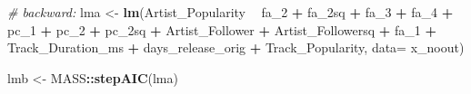 \documentclass[
]{article}
\newenvironment{Shaded}{\begin{snugshade}}{\end{snugshade}}
\newcommand{\CommentTok}[1]{\textcolor[rgb]{0.56,0.35,0.01}{\textit{#1}}}
\newcommand{\DataTypeTok}[1]{\textcolor[rgb]{0.13,0.29,0.53}{#1}}
\newcommand{\DecValTok}[1]{\textcolor[rgb]{0.00,0.00,0.81}{#1}}
\newcommand{\KeywordTok}[1]{\textcolor[rgb]{0.13,0.29,0.53}{\textbf{#1}}}
\newcommand{\NormalTok}[1]{#1}
\newcommand{\OperatorTok}[1]{\textcolor[rgb]{0.81,0.36,0.00}{\textbf{#1}}}
\newcommand{\StringTok}[1]{\textcolor[rgb]{0.31,0.60,0.02}{#1}}
\begin{document}
\begin{Shaded}
\begin{Highlighting}[]
\CommentTok{# backward:}
\NormalTok{lma <-}\StringTok{ }\KeywordTok{lm}\NormalTok{(Artist_Popularity }\OperatorTok{~}\StringTok{ }\NormalTok{fa_}\DecValTok{2} \OperatorTok{+}\StringTok{ }\NormalTok{fa_2sq }\OperatorTok{+}\StringTok{ }\NormalTok{fa_}\DecValTok{3} \OperatorTok{+}\StringTok{ }\NormalTok{fa_}\DecValTok{4} \OperatorTok{+}\StringTok{ }\NormalTok{pc_}\DecValTok{1} \OperatorTok{+}\StringTok{ }\NormalTok{pc_}\DecValTok{2} \OperatorTok{+}\StringTok{ }\NormalTok{pc_2sq }\OperatorTok{+}\StringTok{ }\NormalTok{Artist_Follower }
          \OperatorTok{+}\StringTok{ }\NormalTok{Artist_Followersq }\OperatorTok{+}\StringTok{ }\NormalTok{fa_}\DecValTok{1} \OperatorTok{+}\StringTok{ }\NormalTok{Track_Duration_ms}
          \OperatorTok{+}\StringTok{ }\NormalTok{days_release_orig }\OperatorTok{+}\StringTok{ }\NormalTok{Track_Popularity, }
          \DataTypeTok{data=}\NormalTok{ x_noout)}

\NormalTok{lmb <-}\StringTok{ }\NormalTok{MASS}\OperatorTok{::}\KeywordTok{stepAIC}\NormalTok{(lma)}
\end{Highlighting}
\end{Shaded}
\end{document}
